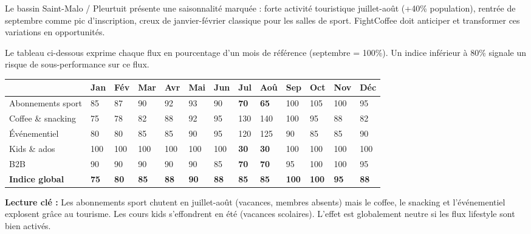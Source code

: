 \documentclass[11pt, a4paper]{article}
\newcommand{\redcell}[1]{\textcolor{fc-red}{\textbf{#1}}}
\newcommand{\posnum}[1]{\textcolor{green!60!black}{#1}}
\begin{document}
Le bassin Saint-Malo / Pleurtuit présente une saisonnalité marquée : forte activité touristique juillet-août (+40\% population), rentrée de septembre comme pic d'inscription, creux de janvier-février classique pour les salles de sport. FightCoffee doit anticiper et transformer ces variations en opportunités.

Le tableau ci-dessous exprime chaque flux en pourcentage d'un mois de référence (septembre = 100\%). Un indice inférieur à 80\% signale un risque de sous-performance sur ce flux.

\begin{center}
\small
\begin{tabular}{@{}p{2.5cm}p{0.6cm}p{0.6cm}p{0.6cm}p{0.6cm}p{0.6cm}p{0.6cm}p{0.6cm}p{0.6cm}p{0.6cm}p{0.6cm}p{0.6cm}p{0.6cm}@{}}
\toprule
\rowcolor{fc-ink} & \color{white}\textbf{Jan} & \color{white}\textbf{Fév} & \color{white}\textbf{Mar} & \color{white}\textbf{Avr} & \color{white}\textbf{Mai} & \color{white}\textbf{Jun} & \color{white}\textbf{Jul} & \color{white}\textbf{Aoû} & \color{white}\textbf{Sep} & \color{white}\textbf{Oct} & \color{white}\textbf{Nov} & \color{white}\textbf{Déc} \\
\midrule
Abonnements sport & 85 & 87 & 90 & 92 & 93 & 90 & \redcell{70} & \redcell{65} & \posnum{100} & \posnum{105} & \posnum{100} & 95 \\
\rowcolor{fc-bg2} Coffee \& snacking & 75 & 78 & 82 & 88 & 92 & 95 & \posnum{130} & \posnum{140} & \posnum{100} & 95 & 88 & 82 \\
Événementiel & 80 & 80 & 85 & 85 & 90 & 95 & \posnum{120} & \posnum{125} & 90 & 85 & 85 & 90 \\
\rowcolor{fc-bg2} Kids \& ados & \posnum{100} & \posnum{100} & \posnum{100} & \posnum{100} & \posnum{100} & \posnum{100} & \redcell{30} & \redcell{30} & \posnum{100} & \posnum{100} & \posnum{100} & \posnum{100} \\
B2B & 90 & 90 & 90 & 90 & 90 & 85 & \redcell{70} & \redcell{70} & 95 & \posnum{100} & \posnum{100} & 95 \\
\midrule
\textbf{Indice global} & \textbf{75} & \textbf{80} & \textbf{85} & \textbf{88} & \textbf{90} & \textbf{88} & \textbf{85} & \textbf{85} & \textbf{100} & \textbf{100} & \textbf{95} & \textbf{88} \\
\bottomrule
\end{tabular}
\end{center}

\textbf{Lecture clé :} Les abonnements sport chutent en juillet-août (vacances, membres absents) mais le coffee, le snacking et l'événementiel explosent grâce au tourisme. Les cours kids s'effondrent en été (vacances scolaires). L'effet est globalement neutre si les flux lifestyle sont bien activés.
\end{document}
